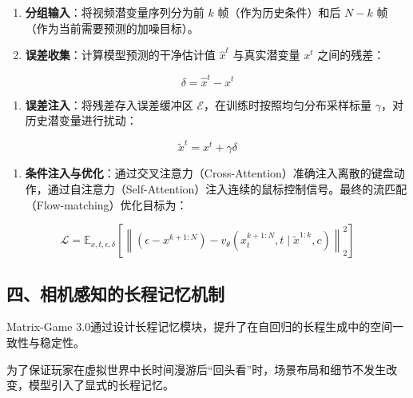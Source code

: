 \begin{enumerate}
\def\labelenumi{\arabic{enumi}.}
\item
  \textbf{分组输入}：将视频潜变量序列分为前 \(k\) 帧（作为历史条件）和后 \(N-k\) 帧（作为当前需要预测的加噪目标）。
\item
{}
  \textbf{误差收集}：计算模型预测的干净估计值 \(\hat{x}^t\) 与真实潜变量 \(x^t\) 之间的残差：
\end{enumerate}

\[
\delta = \hat{x}^t - x^t
\]

\begin{enumerate}
\def\labelenumi{\arabic{enumi}.}
\setcounter{enumi}{2}
\tightlist
\item
{}
  \textbf{误差注入}：将残差存入误差缓冲区 \(\mathcal{E}\)，在训练时按照均匀分布采样标量 \(\gamma\)，对历史潜变量进行扰动：
\end{enumerate}

\[
\tilde{x}^t = x^t + \gamma\delta
\]

\begin{enumerate}
\def\labelenumi{\arabic{enumi}.}
\setcounter{enumi}{3}
\tightlist
\item
{}
  \textbf{条件注入与优化}：通过交叉注意力（Cross-Attention）准确注入离散的键盘动作，通过自注意力（Self-Attention）注入连续的鼠标控制信号。最终的流匹配（Flow-matching）优化目标为：
\end{enumerate}

\[
\mathcal{L} = \mathbb{E}_{x,t,\epsilon,\delta}\left[\left\|\left(\epsilon - x^{k+1:N}\right) - v_{\theta}\left(x_t^{k+1:N}, t\mid \tilde{x}^{1:k}, c\right)\right\|_2^2\right]
\]

\hypertarget{ux56dbux76f8ux673aux611fux77e5ux7684ux957fux7a0bux8bb0ux5fc6ux673aux5236}{%
\subsection{四、相机感知的长程记忆机制}\label{ux56dbux76f8ux673aux611fux77e5ux7684ux957fux7a0bux8bb0ux5fc6ux673aux5236}}

Matrix-Game 3.0通过设计长程记忆模块，提升了在自回归的长程生成中的空间一致性与稳定性。

为了保证玩家在虚拟世界中长时间漫游后``回头看''时，场景布局和细节不发生改变，模型引入了显式的长程记忆。


